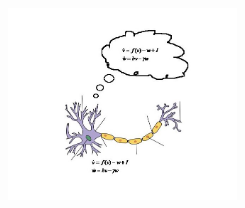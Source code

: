\documentclass[11pt,letterpaper]{article}
\begin{document}
\vfill

\begin{center}
  \includegraphics[height=2in]{neuronthinking}
\end{center}
\end{document}
